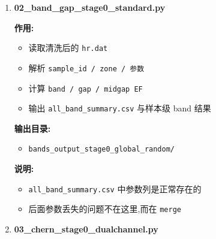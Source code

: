 \documentclass[lang=cn,scheme=chinese,color=blue,device=normal,toc=onecol,math=cm]{elegantbook}
\begin{document}
\begin{enumerate}
\textbf{输出目录:}\par
 
\begin{itemize}
\item \texttt{clean\_\allowbreak{}raw\_\allowbreak{}hr\_\allowbreak{}stage0\_\allowbreak{}global\_\allowbreak{}random/\allowbreak{}}
\end{itemize}
 
\textbf{说明:}\par
 
\begin{itemize}
\item 之前清洗报错“cannot find num\_\allowbreak{}wann line”已经修好
\item 新版清洗脚本可以兼容当前这批 \texttt{hr.dat} 的真实格式
\end{itemize}
\item \textbf{02\_\allowbreak{}band\_\allowbreak{}gap\_\allowbreak{}stage0\_\allowbreak{}standard.py}\par
 
\textbf{作用:}\par
 
\begin{itemize}
\item 读取清洗后的 \texttt{hr.dat}
\item 解析 \texttt{sample\_\allowbreak{}id /\allowbreak{} zone /\allowbreak{} 参数}
\item 计算 \texttt{band /\allowbreak{} gap /\allowbreak{} midgap EF}
\item 输出 \texttt{all\_\allowbreak{}band\_\allowbreak{}summary.csv} 与样本级 band 结果
\end{itemize}
 
\textbf{输出目录:}\par
 
\begin{itemize}
\item \texttt{bands\_\allowbreak{}output\_\allowbreak{}stage0\_\allowbreak{}global\_\allowbreak{}random/\allowbreak{}}
\end{itemize}
 
\textbf{说明:}\par
 
\begin{itemize}
\item \texttt{all\_\allowbreak{}band\_\allowbreak{}summary.csv} 中参数列是正常存在的
\item 后面参数丢失的问题不在这里,而在 \texttt{merge}
\end{itemize}
\item \textbf{03\_\allowbreak{}chern\_\allowbreak{}stage0\_\allowbreak{}dualchannel.py}\par
 

\end{enumerate}
\end{document}
